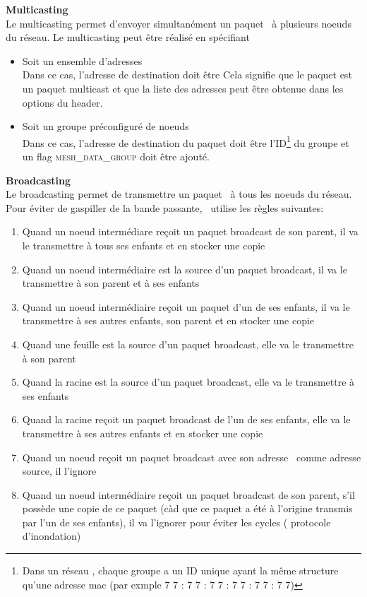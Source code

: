 \textbf{Multicasting}\\
    Le multicasting permet d'envoyer simultanément un paquet \espmesh\ à plusieurs noeuds du réseau. Le multicasting
    peut être réalisé en spécifiant
    \begin{itemize}
        \item Soit un ensemble d'adresses \mac\\
            Dans ce cas, l'adresse de destination doit être
            {\selectfont {}}
            Cela signifie que le paquet est un paquet multicast et que la liste des adresses peut être obtenue dans les options du header.
        \item Soit un groupe préconfiguré de noeuds\\
            Dans ce cas, l'adresse de destination du paquet doit être l'ID\footnote{Dans un réseau \espmesh, chaque groupe a un ID unique
            ayant la même structure qu'une adresse mac (par exmple {\small 7 7 : 7 7 : 7 7 : 7 7 : 7 7 : 7 7})}
            du groupe et un flag \textsc{mesh\_data\_group} doit être ajouté. %
    \end{itemize}

\vspace{0.5cm}
\textbf{Broadcasting}\\
    Le broadcasting permet de transmettre un paquet \espmesh\ à tous les noeuds du réseau. Pour éviter de gaspiller de
    la bande passante, \espmesh\ utilise les règles suivantes:
    \begin{enumerate}
        \item Quand un noeud intermédiare reçoit un paquet broadcast de son parent, il va le transmettre à tous ses enfants
            et en stocker une copie
        \item Quand un noeud intermédiaire est la source d'un paquet broadcast, il va le transmettre à son parent et à ses enfants
        \item Quand un noeud intermédiaire reçoit un paquet d'un de ses enfants, il va le transmettre à ses autres enfants, son parent
            et en stocker une copie
        \item Quand une feuille est la source d'un paquet broadcast, elle va le transmettre à son parent
        \item Quand la racine est la source d'un paquet broadcast, elle va le transmettre à ses enfants
        \item Quand la racine reçoit un paquet broadcast de l'un de ses enfants, elle va le transmettre à ses autres enfants et en stocker une copie
        \item Quand un noeud reçoit un paquet broadcast avec son adresse \mac\ comme adresse source, il l'ignore
        \item Quand un noeud intermédiaire reçoit un paquet broadcast de son parent, s'il possède une copie de ce paquet (càd que ce paquet a été à l'origine transmis par l'un de ses enfants), il va l'ignorer
            pour éviter les cycles ( protocole d'inondation)
    \end{enumerate}